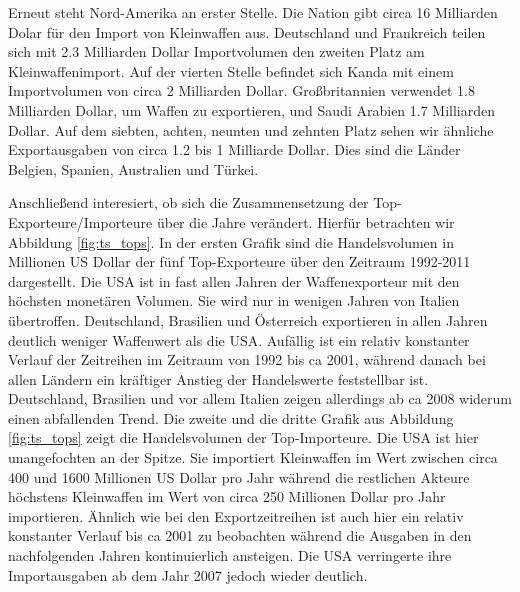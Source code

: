 \documentclass[a4paper,ngerman,oneside,titlepage,bibliography=totoc,11pt]{scrreprt}
\begin{document}
Erneut steht Nord-Amerika an erster Stelle. Die Nation gibt circa 16 Milliarden Dolar für den Import von Kleinwaffen aus. Deutschland und Frankreich teilen sich mit 2.3 Milliarden Dollar Importvolumen den zweiten Platz am Kleinwaffenimport. Auf der vierten Stelle befindet sich Kanda mit einem Importvolumen von circa 2 Milliarden Dollar. Großbritannien verwendet 1.8 Milliarden Dollar, um Waffen zu exportieren, und Saudi Arabien 1.7 Milliarden Dollar. Auf dem siebten, achten, neunten und zehnten Platz sehen wir ähnliche Exportausgaben von circa 1.2 bis 1 Milliarde Dollar. Dies sind die Länder Belgien, Spanien, Australien und Türkei.

Anschließend interesiert, ob sich die Zusammensetzung der Top-Exporteure/Importeure über die Jahre verändert. Hierfür betrachten wir Abbildung \ref{fig:ts_tops}. 
In der ersten Grafik sind die Handelsvolumen in Millionen US Dollar der fünf Top-Exporteure über den Zeitraum 1992-2011 dargestellt. Die USA ist in fast allen Jahren der Waffenexporteur mit den höchsten monetären Volumen. Sie wird nur in wenigen Jahren von Italien übertroffen. Deutschland, Brasilien und Österreich exportieren in allen Jahren deutlich weniger Waffenwert als die USA. Aufällig ist ein relativ konstanter Verlauf der Zeitreihen im Zeitraum von 1992 bis ca 2001, während danach bei allen Ländern ein kräftiger Anstieg der Handelswerte feststellbar ist. Deutschland, Brasilien und vor allem Italien zeigen allerdings ab ca 2008 widerum einen abfallenden Trend.
Die zweite und die dritte Grafik aus Abbildung \ref{fig:ts_tops} zeigt die Handelsvolumen der Top-Importeure. Die USA ist hier unangefochten an der Spitze. Sie importiert Kleinwaffen im Wert zwischen circa 400 und 1600 Millionen US Dollar pro Jahr während die restlichen Akteure höchstens Kleinwaffen im Wert von circa 250 Millionen Dollar pro Jahr importieren. Ähnlich wie bei den Exportzeitreihen ist auch hier ein relativ konstanter Verlauf bis ca 2001 zu beobachten während die Ausgaben in den nachfolgenden Jahren kontinuierlich ansteigen. Die USA verringerte ihre Importausgaben ab dem Jahr 2007 jedoch wieder deutlich. 
\end{document}
